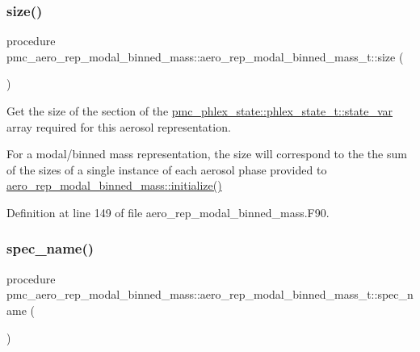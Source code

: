 \subsubsection{\texorpdfstring{size()}{size()}}
{\footnotesize\ttfamily procedure pmc\+\_\+aero\+\_\+rep\+\_\+modal\+\_\+binned\+\_\+mass\+::aero\+\_\+rep\+\_\+modal\+\_\+binned\+\_\+mass\+\_\+t\+::size (\begin{DoxyParamCaption}{ }\end{DoxyParamCaption})\hspace{0.3cm}{\ttfamily [private]}}



Get the size of the section of the {\ttfamily \mbox{\hyperlink{structpmc__phlex__state_1_1phlex__state__t_a78835cb552d483ebbfc7a6bc6f756918}{pmc\+\_\+phlex\+\_\+state\+::phlex\+\_\+state\+\_\+t\+::state\+\_\+var}}} array required for this aerosol representation. 

For a modal/binned mass representation, the size will correspond to the the sum of the sizes of a single instance of each aerosol phase provided to {\ttfamily \mbox{\hyperlink{namespacepmc__aero__rep__modal__binned__mass_ab5b93faae1796c83780773a5475adeed}{aero\+\_\+rep\+\_\+modal\+\_\+binned\+\_\+mass\+::initialize()}}} 

Definition at line 149 of file aero\+\_\+rep\+\_\+modal\+\_\+binned\+\_\+mass.\+F90.

\mbox{\label{structpmc__aero__rep__modal__binned__mass_1_1aero__rep__modal__binned__mass__t_ab56e76308ccc81ab3cd193419733759a}} 
\subsubsection{\texorpdfstring{spec\+\_\+name()}{spec\_name()}}
{\footnotesize\ttfamily procedure pmc\+\_\+aero\+\_\+rep\+\_\+modal\+\_\+binned\+\_\+mass\+::aero\+\_\+rep\+\_\+modal\+\_\+binned\+\_\+mass\+\_\+t\+::spec\+\_\+name (\begin{DoxyParamCaption}{ }\end{DoxyParamCaption})\hspace{0.3cm}{\ttfamily [private]}}




